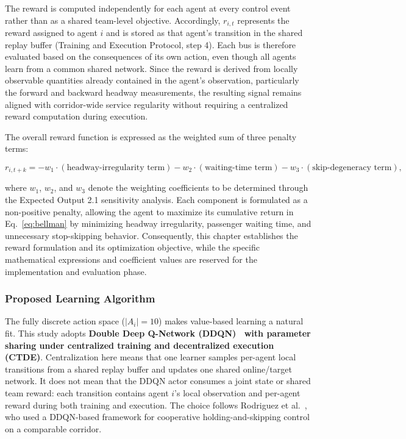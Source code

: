 The reward is computed independently for each agent at every control event rather than as a shared team-level objective. Accordingly, $r_{i,t}$ represents the reward assigned to agent $i$ and is stored as that agent's transition in the shared replay buffer (Training and Execution Protocol, step 4). Each bus is therefore evaluated based on the consequences of its own action, even though all agents learn from a common shared network. Since the reward is derived from locally observable quantities already contained in the agent's observation, particularly the forward and backward headway measurements, the resulting signal remains aligned with corridor-wide service regularity without requiring a centralized reward computation during execution.

The overall reward function is expressed as the weighted sum of three penalty terms:

\begin{equation}
r_{i,t+k} = -w_1 \cdot (\text{headway-irregularity term}) - w_2 \cdot (\text{waiting-time term}) - w_3 \cdot (\text{skip-degeneracy term}),
\label{eq:reward-form}
\end{equation}

where $w_1$, $w_2$, and $w_3$ denote the weighting coefficients to be determined through the Expected Output 2.1 sensitivity analysis. Each component is formulated as a non-positive penalty, allowing the agent to maximize its cumulative return in Eq.~\eqref{eq:bellman} by minimizing headway irregularity, passenger waiting time, and unnecessary stop-skipping behavior. Consequently, this chapter establishes the reward formulation and its optimization objective, while the specific mathematical expressions and coefficient values are reserved for the implementation and evaluation phase.

\subsubsection{Proposed Learning Algorithm}
\label{subsec:proposed-algorithm}

The fully discrete action space ($|A_i| = 10$) makes value-based learning a natural fit. This study adopts \textbf{Double Deep Q-Network (DDQN)~\cite{vanHasselt2016DDQN} with parameter sharing under centralized training and decentralized execution (CTDE)}. Centralization here means that one learner samples per-agent local transitions from a shared replay buffer and updates one shared online/target network. It does not mean that the DDQN actor consumes a joint state or shared team reward: each transition contains agent $i$'s local observation and per-agent reward during both training and execution. The choice follows Rodriguez et al.~\cite{Rodriguez2023Cooperative}, who used a DDQN-based framework for cooperative holding-and-skipping control on a comparable corridor.

